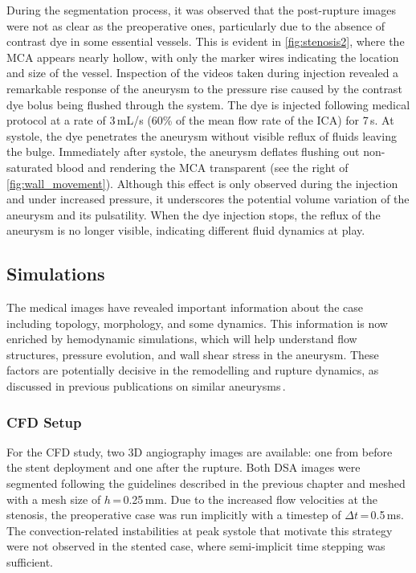 During the segmentation process, it was observed that the post-rupture images were not as clear as the preoperative ones, particularly due to the absence of contrast dye in some essential vessels. This is evident in \autoref{fig:stenosis2}, where the MCA appears nearly hollow, with only the marker wires indicating the location and size of the vessel. Inspection of the videos taken during injection revealed a remarkable response of the aneurysm to the pressure rise caused by the contrast dye bolus being flushed through the system. The dye is injected following medical protocol at a rate of 3\,mL/s (60\% of the mean flow rate of the ICA) for 7\,s. At systole, the dye penetrates the aneurysm without visible reflux of fluids leaving the bulge. Immediately after systole, the aneurysm deflates flushing out non-saturated blood and rendering the MCA transparent (see the right of \autoref{fig:wall_movement}). Although this effect is only observed during the injection and under increased pressure, it underscores the potential volume variation of the aneurysm and its pulsatility. When the dye injection stops, the reflux of the aneurysm is no longer visible, indicating different fluid dynamics at play.

\subsection{Simulations}

The medical images have revealed important information about the case including topology, morphology, and some dynamics. This information is now enriched by hemodynamic simulations, which will help understand flow structures, pressure evolution, and wall shear stress in the aneurysm. These factors are potentially decisive in the remodelling and rupture dynamics, as discussed in previous publications on similar aneurysms\,\cite{Cebral2011, Hirato2023, Li2019}.

\subsubsection*{CFD Setup}
For the CFD study, two 3D angiography images are available: one from before the stent deployment and one after the rupture. Both DSA images were segmented following the guidelines described in the previous chapter and meshed with a mesh size of $h$\,=\,0.25\,mm. Due to the increased flow velocities at the stenosis, the preoperative case was run implicitly with a timestep of $\Delta t$\,=\,0.5\,ms. The convection-related instabilities at peak systole that motivate this strategy were not observed in the stented case, where semi-implicit time stepping was sufficient.

